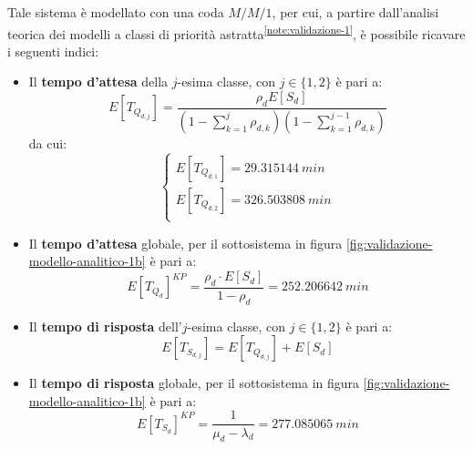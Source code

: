 Tale sistema è modellato con una coda $M/M/1$, per cui, a partire dall'analisi teorica dei modelli a classi di priorità astratta\textsuperscript{\ref{note:validazione-1}}, è possibile ricavare i seguenti indici:
\begin{itemize}
\item Il \textbf{tempo d'attesa} della $j$-esima classe, con $j\in\lbrace 1, 2\rbrace$ è pari a:
\begin{equation}
E[T_{Q_{d,j}}] = \frac{\rho_d E[S_d]}{\left(1- \sum_{k=1}^{j} \rho_{d,k}\right)\left(1- \sum_{k=1}^{j-1} \rho_{d,k}\right)}
\end{equation}
da cui:
\begin{equation}
\begin{cases}
E[T_{Q_{d,1}}] = 29.315144\ min \\[1.5em]
E[T_{Q_{d,2}}] = 326.503808\ min \\[1em]
\end{cases}
\end{equation}
\item Il \textbf{tempo d'attesa} globale, per il sottosistema in figura \ref{fig:validazione-modello-analitico-1b} è pari a:
\begin{equation}
E[T_{Q_d}]^{KP} = \frac{\rho_d \cdot E[S_d]}{1-\rho_d} = 252.206642\ min
\end{equation}
\item Il \textbf{tempo di risposta} dell'$j$-esima classe, con $j\in\lbrace 1, 2\rbrace$ è pari a:
\begin{equation}
E[T_{S_{d,j}}] = E[T_{Q_{d,j}}] + E[S_d]
\end{equation}
\item Il \textbf{tempo di risposta} globale, per il sottosistema in figura \ref{fig:validazione-modello-analitico-1b} è pari a:
\begin{equation}
E[T_{S_d}]^{KP} = \frac{1}{\mu_d - \lambda_d} = 277.085065\ min
\end{equation}
\end{itemize}



